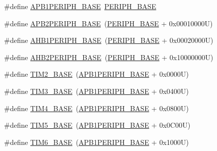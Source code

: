 \begin{DoxyCompactItemize}
\#define \hyperlink{group___peripheral__memory__map_ga45666d911f39addd4c8c0a0ac3388cfb}{A\+P\+B1\+P\+E\+R\+I\+P\+H\+\_\+\+B\+A\+SE}~\hyperlink{group___peripheral__memory__map_ga9171f49478fa86d932f89e78e73b88b0}{P\+E\+R\+I\+P\+H\+\_\+\+B\+A\+SE}
\item 
\#define \hyperlink{group___peripheral__memory__map_ga25b99d6065f1c8f751e78f43ade652cb}{A\+P\+B2\+P\+E\+R\+I\+P\+H\+\_\+\+B\+A\+SE}~(\hyperlink{group___peripheral__memory__map_ga9171f49478fa86d932f89e78e73b88b0}{P\+E\+R\+I\+P\+H\+\_\+\+B\+A\+SE} + 0x00010000\+U)
\item 
\#define \hyperlink{group___peripheral__memory__map_ga811a9a4ca17f0a50354a9169541d56c4}{A\+H\+B1\+P\+E\+R\+I\+P\+H\+\_\+\+B\+A\+SE}~(\hyperlink{group___peripheral__memory__map_ga9171f49478fa86d932f89e78e73b88b0}{P\+E\+R\+I\+P\+H\+\_\+\+B\+A\+SE} + 0x00020000\+U)
\item 
\#define \hyperlink{group___peripheral__memory__map_gaeedaa71d22a1948492365e2cd26cfd46}{A\+H\+B2\+P\+E\+R\+I\+P\+H\+\_\+\+B\+A\+SE}~(\hyperlink{group___peripheral__memory__map_ga9171f49478fa86d932f89e78e73b88b0}{P\+E\+R\+I\+P\+H\+\_\+\+B\+A\+SE} + 0x10000000\+U)
\item 
\#define \hyperlink{group___peripheral__memory__map_ga00d0fe6ad532ab32f0f81cafca8d3aa5}{T\+I\+M2\+\_\+\+B\+A\+SE}~(\hyperlink{group___peripheral__memory__map_ga45666d911f39addd4c8c0a0ac3388cfb}{A\+P\+B1\+P\+E\+R\+I\+P\+H\+\_\+\+B\+A\+SE} + 0x0000\+U)
\item 
\#define \hyperlink{group___peripheral__memory__map_gaf0c34a518f87e1e505cd2332e989564a}{T\+I\+M3\+\_\+\+B\+A\+SE}~(\hyperlink{group___peripheral__memory__map_ga45666d911f39addd4c8c0a0ac3388cfb}{A\+P\+B1\+P\+E\+R\+I\+P\+H\+\_\+\+B\+A\+SE} + 0x0400\+U)
\item 
\#define \hyperlink{group___peripheral__memory__map_ga56e2d44b0002f316527b8913866a370d}{T\+I\+M4\+\_\+\+B\+A\+SE}~(\hyperlink{group___peripheral__memory__map_ga45666d911f39addd4c8c0a0ac3388cfb}{A\+P\+B1\+P\+E\+R\+I\+P\+H\+\_\+\+B\+A\+SE} + 0x0800\+U)
\item 
\#define \hyperlink{group___peripheral__memory__map_ga3e1671477190d065ba7c944558336d7e}{T\+I\+M5\+\_\+\+B\+A\+SE}~(\hyperlink{group___peripheral__memory__map_ga45666d911f39addd4c8c0a0ac3388cfb}{A\+P\+B1\+P\+E\+R\+I\+P\+H\+\_\+\+B\+A\+SE} + 0x0\+C00\+U)
\item 
\#define \hyperlink{group___peripheral__memory__map_ga8268ec947929f192559f28c6bf7d1eac}{T\+I\+M6\+\_\+\+B\+A\+SE}~(\hyperlink{group___peripheral__memory__map_ga45666d911f39addd4c8c0a0ac3388cfb}{A\+P\+B1\+P\+E\+R\+I\+P\+H\+\_\+\+B\+A\+SE} + 0x1000\+U)

\end{DoxyCompactItemize}
